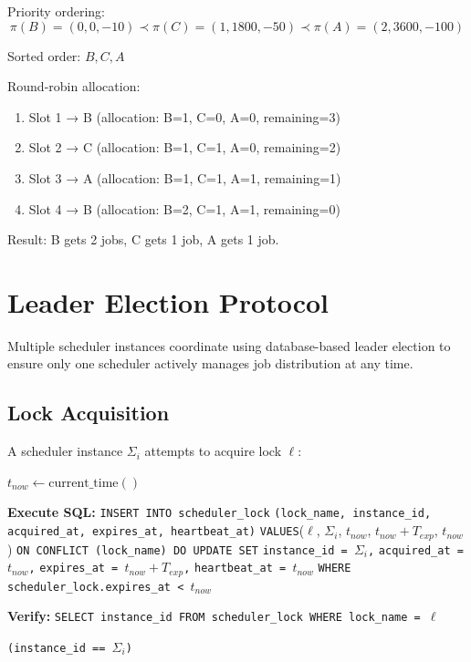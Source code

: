 \documentclass[11pt]{article}
\begin{document}
Priority ordering:
\begin{equation}
\pi(B) = (0, 0, -10) \prec \pi(C) = (1, 1800, -50) \prec \pi(A) = (2, 3600, -100)
\end{equation}

Sorted order: $B, C, A$

Round-robin allocation:
\begin{enumerate}
\item Slot 1 → B (allocation: B=1, C=0, A=0, remaining=3)
\item Slot 2 → C (allocation: B=1, C=1, A=0, remaining=2)
\item Slot 3 → A (allocation: B=1, C=1, A=1, remaining=1)
\item Slot 4 → B (allocation: B=2, C=1, A=1, remaining=0)
\end{enumerate}

Result: B gets 2 jobs, C gets 1 job, A gets 1 job.

\section{Leader Election Protocol}

Multiple scheduler instances coordinate using database-based leader election to ensure only one scheduler actively manages job distribution at any time.

\subsection{Lock Acquisition}

A scheduler instance $\Sigma_i$ attempts to acquire lock $\ell$:

\begin{algorithm}[H]
\caption{Acquire Leader Lock}
\begin{algorithmic}[1]
  \State $t_{now} \gets \text{current\_time}()$

  \State \textbf{Execute SQL:}
  \State \quad \texttt{INSERT INTO scheduler\_lock}
  \State \quad \texttt{(lock\_name, instance\_id, acquired\_at, expires\_at, heartbeat\_at)}
  \State \quad \texttt{VALUES}($\ell$, $\Sigma_i$, $t_{now}$, $t_{now} + T_{exp}$, $t_{now}$)
  \State \quad \texttt{ON CONFLICT (lock\_name) DO UPDATE SET}
  \State \quad \quad \texttt{instance\_id = }$\Sigma_i$\texttt{,}
  \State \quad \quad \texttt{acquired\_at = }$t_{now}$\texttt{,}
  \State \quad \quad \texttt{expires\_at = }$t_{now} + T_{exp}$\texttt{,}
  \State \quad \quad \texttt{heartbeat\_at = }$t_{now}$
  \State \quad \texttt{WHERE scheduler\_lock.expires\_at < }$t_{now}$

  \State \textbf{Verify:}
  \State \quad \texttt{SELECT instance\_id FROM scheduler\_lock WHERE lock\_name = }$\ell$

  \State \Return \texttt{(instance\_id == }$\Sigma_i$\texttt{)}
\EndProcedure
\end{algorithmic}
\end{algorithm}
\end{document}
